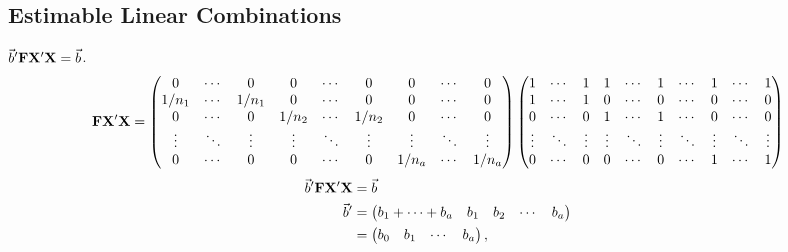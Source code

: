 \subsection*{Estimable Linear Combinations}
$ \vec{b}'\mathbf{F}\mathbf{X}'\mathbf{X}=\vec{b} $.
\begin{align*}
    \mathbf{F}\mathbf{X}'\mathbf{X}
     & =\begin{pmatrix}
            0      & \cdots & 0      & 0      & \cdots & 0      & 0      & \cdots & 0      \\
            1/n_1  & \cdots & 1/n_1  & 0      & \cdots & 0      & 0      & \cdots & 0      \\
            0      & \cdots & 0      & 1/n_2  & \cdots & 1/n_2  & 0      & \cdots & 0      \\
            \vdots & \ddots & \vdots & \vdots & \ddots & \vdots & \vdots & \ddots & \vdots \\
            0      & \cdots & 0      & 0      & \cdots & 0      & 1/n_a  & \cdots & 1/n_a
        \end{pmatrix}\begin{pmatrix}
                         1      & \cdots & 1      & 1      & \cdots & 1      & \cdots & 1      & \cdots & 1      \\
                         1      & \cdots & 1      & 0      & \cdots & 0      & \cdots & 0      & \cdots & 0      \\
                         0      & \cdots & 0      & 1      & \cdots & 1      & \cdots & 0      & \cdots & 0      \\
                         \vdots & \ddots & \vdots & \vdots & \ddots & \vdots & \ddots & \vdots & \ddots & \vdots \\
                         0      & \cdots & 0      & 0      & \cdots & 0      & \cdots & 1      & \cdots & 1
                     \end{pmatrix} \\
\end{align*}
\begin{align*}
    \vec{b}'\mathbf{F}\mathbf{X}'\mathbf{X} & =\vec{b}                                    \\
    \vec{b}'                                & =\begin{pmatrix}
                                                      b_1 + \cdots + b_a & b_1 & b_2 & \cdots & b_a
                                                  \end{pmatrix} \\
                                               & =\begin{pmatrix}
                                                      b_0 & b_1 & \cdots & b_a
                                                  \end{pmatrix},
\end{align*}
